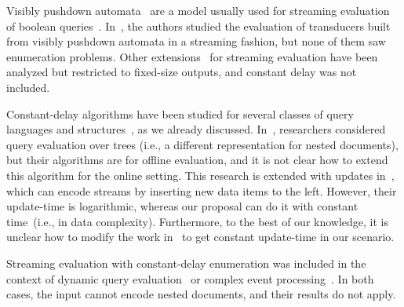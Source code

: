 Visibly pushdown automata~\cite{AlurM04} {are} a model usually used for streaming evaluation of boolean queries~\cite{KumarMV07}. 
In~\cite{FiliotGRS19,AlurFMRS20}, the authors studied the evaluation of transducers built from visibly pushdown automata in a streaming fashion, but none of them {saw} enumeration problems. 
Other extensions~\cite{GauwinNR08} for streaming evaluation have been analyzed but restricted to fixed-size outputs, and constant delay was not included. 

Constant-delay algorithms have been studied for several classes of query languages and structures~\cite{Segoufin13}, as we already discussed. In~\cite{Bagan06,AmarilliBJM17}, researchers considered query evaluation over trees (i.e., a different representation {for} nested documents), but their algorithms are for offline evaluation, and {it is not clear how to extend this algorithm for the online setting}. 
This research is extended with updates in~\cite{AmarilliBMN19pods}, which can encode streams by inserting new data items to the left. However, their update-time is logarithmic, whereas our proposal can do it with constant time~(i.e., in data complexity).
Furthermore, to the best of our knowledge, it is unclear how to modify the work in~\cite{AmarilliBMN19pods} to get constant update-time in our scenario.

Streaming evaluation with constant-delay enumeration was included in the context of dynamic query evaluation~{\cite{IdrisUV17,BerkholzKS17,NikolicO18,0002NOZ20}} or complex event processing~\cite{GrezRU19,GrezR20}. In both cases, the input cannot encode nested documents, and their results do not apply.

%




